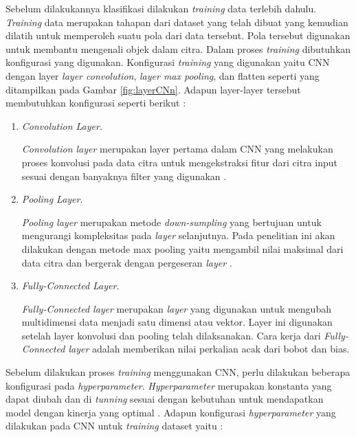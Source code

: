 Sebelum dilakukannya klasifikasi dilakukan \emph{training} data terlebih dahulu. \emph{Training} data merupakan tahapan dari dataset yang telah dibuat yang kemudian dilatih untuk memperoleh suatu pola dari data tersebut. Pola tersebut digunakan untuk membantu mengenali objek dalam citra. Dalam proses \emph{training} dibutuhkan konfigurasi yang digunakan. Konfigurasi \emph{training} yang digunakan yaitu CNN dengan layer \emph{layer convolution}, \emph{layer max pooling},  dan flatten seperti yang ditampilkan pada Gambar \ref*{fig:layerCNn}. Adapun layer-layer tersebut membutuhkan konfigurasi seperti berikut :
\begin{enumerate}
  \item \emph{Convolution Layer}. \par
  \emph{Convolution layer} merupakan layer pertama dalam CNN yang melakukan proses konvolusi pada data citra untuk mengekstraksi fitur dari citra input sesuai dengan banyaknya filter yang digunakan \parencite{konvolusilayer}. 
  \item \emph{Pooling Layer}. \par
  \emph{Pooling layer} merupakan metode \emph{down-sumpling} yang bertujuan untuk mengurangi kompleksitas pada \emph{layer} selanjutnya. Pada penelitian ini akan dilakukan dengan metode max pooling yaitu mengambil nilai maksimal dari data citra dan bergerak dengan pergeseran \emph{layer} \parencite{poolilayer}.
  \item \emph{Fully-Connected Layer}. \par
  \emph{Fully-Connected layer} merupakan \emph{layer} yang digunakan untuk mengubah multidimensi data menjadi satu dimensi atau vektor. Layer ini digunakan setelah layer konvolusi dan pooling telah dilaksanakan. Cara kerja dari \emph{Fully-Connected layer} adalah memberikan nilai perkalian acak dari bobot dan bias.
\end{enumerate}
Sebelum dilakukan proses \emph{training} menggunakan CNN, perlu dilakukan beberapa konfigurasi pada \emph{hyperparameter}. \emph{Hyperparameter} merupakan konstanta yang dapat diubah dan di \emph{tunning} sesuai dengan kebutuhan untuk mendapatkan model dengan kinerja yang optimal \parencite{hyperparameter}. Adapun konfigurasi \emph{hyperparameter} yang dilakukan pada CNN untuk \emph{training} dataset yaitu :
